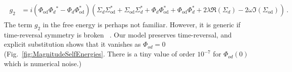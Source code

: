 \begin{align}
\begin{split}
   g_2 &= i \left(\Phi _{\text{od}} \Phi _d{}^\ast-\Phi _d \Phi_{\text{od}}^\ast\right) \left(\Sigma _d \Sigma _{\text{od}}^\ast+\Sigma _{\text{od}} \Sigma _d^\ast+\Phi _d \Phi _{\text{od}}^\ast+\Phi _{\text{od}} \Phi _d^\ast + 2 \lambda  \Re\left(\Sigma _d\right)-2 \omega  \Im(\Sigma _{\text{od}})\right) \, . \nonumber
\end{split}
\end{align}
The term $g_2$ in the free energy is perhaps not familiar. However, it is generic if time-reversal symmetry is broken ~\cite{golubov2004current}. Our model preserves time-reversal, and explicit substitution shows that it vanishes 
as $\Phi_{od}=0$ (Fig.~\ref{fig:MagnitudeSelfEnergies}. There is a tiny value of order $10^{-7}$ for $\Phi_{od}(0)$ which is numerical noise.)

